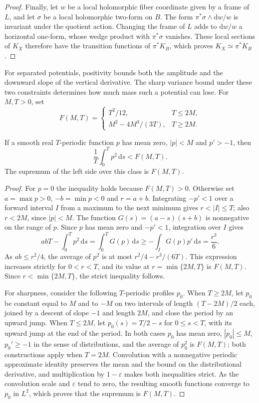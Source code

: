 \begin{proof}
Finally, let $w$ be a local holomorphic fiber coordinate given by a frame of $L$, and let $\sigma$ be a local holomorphic two-form on $B$. The form $\pi^*\sigma\wedge\mathrm{d}w/w$ is invariant under the quotient action. Changing the frame of $L$ adds to $\mathrm{d}w/w$ a horizontal one-form, whose wedge product with $\pi^*\sigma$ vanishes. These local sections of $K_X$ therefore have the transition functions of $\pi^*K_B$, which proves $K_X\simeq\pi^*K_B$.
\end{proof}

For separated potentials, positivity bounds both the amplitude and the downward slope of the vertical derivative. The sharp variance bound under these two constraints determines how much mass such a potential can lose. For $M,T>0$, set
\[
 F(M,T)=
 \begin{cases}
  T^2/12,&T\leq2M,\\
  M^2-4M^3/(3T),&T\geq2M.
 \end{cases}
\]

\begin{lemma}\label{lem:periodic-variance-bound}
If a smooth real $T$-periodic function $p$ has mean zero, $|p|<M$ and $p'>-1$, then
\[
 \frac1T\int_0^T p^2\,\mathrm{d}s<F(M,T).
\]
The supremum of the left side over this class is $F(M,T)$.
\end{lemma}
\begin{proof}
For $p=0$ the inequality holds because $F(M,T)>0$. Otherwise set $a=\max p>0$, $-b=\min p<0$ and $r=a+b$. Integrating $-p'<1$ over a forward interval $I$ from a maximum to the next minimum gives $r<|I|\leq T$; also $r<2M$, since $|p|<M$. The function $G(s)=(a-s)(s+b)$ is nonnegative on the range of $p$. Since $p$ has mean zero and $-p'<1$, integration over $I$ gives
\[
 abT-\int_0^T p^2\,\mathrm{d}s
 =\int_0^T G(p)\,\mathrm{d}s
 \geq-\int_I G(p)p'\,\mathrm{d}s
 =\frac{r^3}{6}.
\]
As $ab\leq r^2/4$, the average of $p^2$ is at most $r^2/4-r^3/(6T)$. This expression increases strictly for $0<r<T$, and its value at $r=\min\{2M,T\}$ is $F(M,T)$. Since $r<\min\{2M,T\}$, the strict inequality follows.

For sharpness, consider the following $T$-periodic profiles $p_0$. When $T\geq2M$, let $p_0$ be constant equal to $M$ and to $-M$ on two intervals of length $(T-2M)/2$ each, joined by a descent of slope $-1$ and length $2M$, and close the period by an upward jump. When $T\leq2M$, let $p_0(s)=T/2-s$ for $0\leq s<T$, with its upward jump at the end of the period. In both cases $p_0$ has mean zero, $|p_0|\leq M$, $p_0'\geq-1$ in the sense of distributions, and the average of $p_0^2$ is $F(M,T)$; both constructions apply when $T=2M$. Convolution with a nonnegative periodic approximate identity preserves the mean and the bound on the distributional derivative, and multiplication by $1-\varepsilon$ makes both inequalities strict. As the convolution scale and $\varepsilon$ tend to zero, the resulting smooth functions converge to $p_0$ in $L^2$, which proves that the supremum is $F(M,T)$.
\end{proof}

